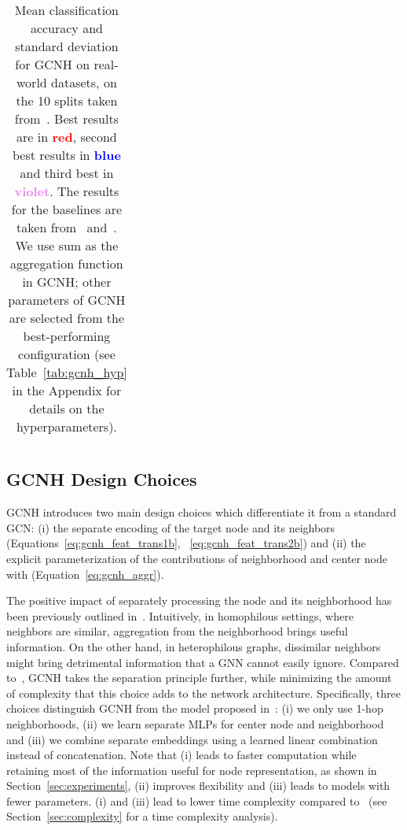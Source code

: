\documentclass[conference]{IEEEtran}
\begin{document}
\begin{table*}[t]
\begin{tabular}{ c c c c c c c c c }
    \end{tabular}
    \caption{Mean classification accuracy and standard deviation for GCNH on real-world datasets, on the 10 splits taken from~\cite{pei_geom-gcn_2019}. Best results are in \textbf{\textcolor{red}{red}}, second best results in \textbf{\textcolor{blue}{blue}} and third best in \textbf{\textcolor{violet}{violet}}. The results for the baselines are taken from~\cite{yan_two_2021} and~\cite{bodnar_neural_2022}. We use sum as the aggregation function in GCNH; other parameters of GCNH are selected from the best-performing configuration (see Table~\ref{tab:gcnh_hyp} in the Appendix for details on the hyperparameters). }
    \label{tab:main_results}
\end{table*}



\subsection{GCNH Design Choices}
\label{sec:gcnh-design}

GCNH introduces two main design choices which differentiate it from a standard GCN: (i) the separate encoding of the target node and its neighbors (Equations~\ref{eq:gcnh_feat_trans1b}, ~\ref{eq:gcnh_feat_trans2b}) and (ii) the explicit parameterization of the contributions of neighborhood and center node with  (Equation~\ref{eq:gcnh_aggr}). 

The positive impact of separately processing the node and its neighborhood has been previously outlined in~\cite{zhu_beyond_2020,suresh_breaking_2021}.
Intuitively, in homophilous settings, where neighbors are similar, aggregation from the neighborhood brings useful information. On the other hand, in heterophilous graphs, dissimilar neighbors might bring detrimental information that a GNN cannot easily ignore.
Compared to~\cite{zhu_beyond_2020}, GCNH takes the separation principle further, while minimizing the amount of complexity that this choice adds to the network architecture.
Specifically, three choices distinguish GCNH from the model proposed in~\cite{zhu_beyond_2020}: (i) we only use 1-hop neighborhoods, (ii) we learn separate MLPs for center node and neighborhood and (iii) we combine separate embeddings using a learned linear combination instead of concatenation.
Note that (i) leads to faster computation while retaining most of the information useful for node representation, as shown in Section~\ref{sec:experiments}, (ii) improves flexibility and (iii) leads to models with fewer parameters. (i) and (iii) lead to lower time complexity compared to~\cite{zhu_beyond_2020} (see Section~\ref{sec:complexity} for a time complexity analysis).
\end{document}
